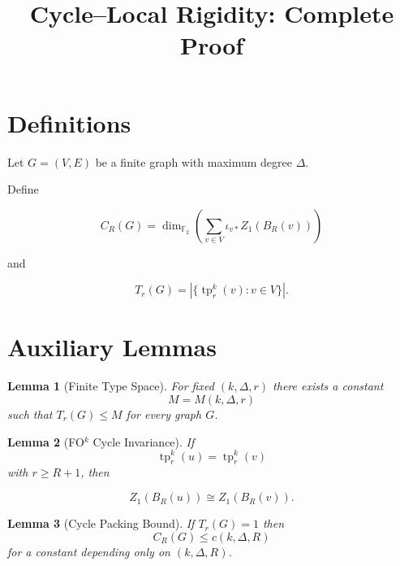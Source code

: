 \documentclass{article}
\newtheorem{lemma}{Lemma}
\begin{document}
\title{Cycle--Local Rigidity: Complete Proof}
\date{}
\maketitle

\begin{center}
\end{center}


\section*{Definitions}

Let $G=(V,E)$ be a finite graph with maximum degree $\Delta$.

Define

\[
C_R(G)
=
\dim_{\mathbb F_2}
\left(
\sum_{v\in V}\iota_{v*}Z_1(B_R(v))
\right)
\]

and

\[
T_r(G)
=
\left|
\{
\operatorname{tp}^k_r(v):v\in V
\}
\right|.
\]

\section*{Auxiliary Lemmas}

\begin{lemma}[Finite Type Space]
For fixed $(k,\Delta,r)$ there exists a constant
\[
M=M(k,\Delta,r)
\]
such that $T_r(G)\le M$ for every graph $G$.
\end{lemma}

\begin{lemma}[FO$^k$ Cycle Invariance]
If
\[
\operatorname{tp}^k_r(u)=\operatorname{tp}^k_r(v)
\]
with $r\ge R+1$, then

\[
Z_1(B_R(u))\cong Z_1(B_R(v)).
\]
\end{lemma}

\begin{lemma}[Cycle Packing Bound]
If $T_r(G)=1$ then
\[
C_R(G)\le c(k,\Delta,R)
\]
for a constant depending only on $(k,\Delta,R)$.
\end{lemma}
\end{document}
